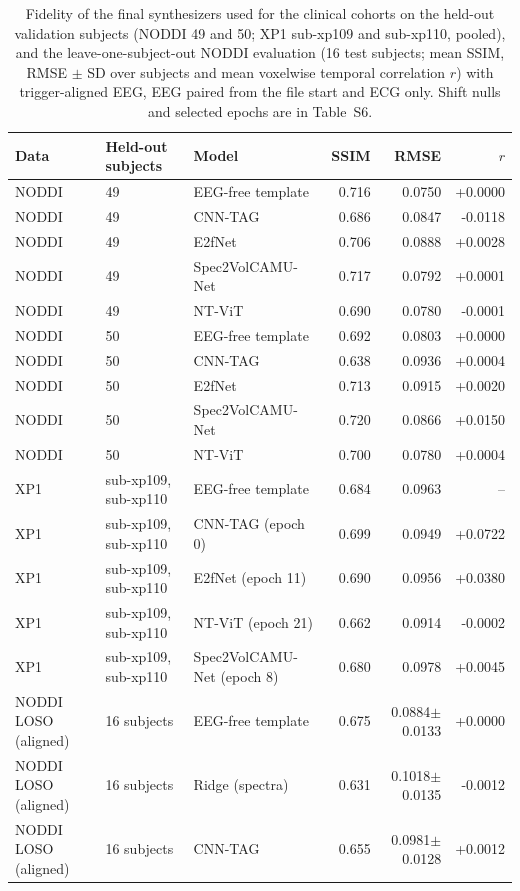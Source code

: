 \documentclass[10pt]{article}
\begin{document}
\begin{longtable}{l l l r r r}
\caption{Fidelity of the final synthesizers used for the clinical cohorts on the held-out validation subjects (NODDI 49 and 50; XP1 sub-xp109 and sub-xp110, pooled), and the leave-one-subject-out NODDI evaluation (16 test subjects; mean SSIM, RMSE $\pm$ SD over subjects and mean voxelwise temporal correlation $r$) with trigger-aligned EEG, EEG paired from the file start and ECG only. Shift nulls and selected epochs are in Table~S6.}\label{tab:s_fid}\\
\toprule
Data & Held-out subjects & Model & SSIM & RMSE & $r$ \\
\midrule
NODDI & 49 & EEG-free template & 0.716 & 0.0750 & +0.0000 \\
NODDI & 49 & CNN-TAG & 0.686 & 0.0847 & -0.0118 \\
NODDI & 49 & E2fNet & 0.706 & 0.0888 & +0.0028 \\
NODDI & 49 & Spec2VolCAMU-Net & 0.717 & 0.0792 & +0.0001 \\
NODDI & 49 & NT-ViT & 0.690 & 0.0780 & -0.0001 \\
NODDI & 50 & EEG-free template & 0.692 & 0.0803 & +0.0000 \\
NODDI & 50 & CNN-TAG & 0.638 & 0.0936 & +0.0004 \\
NODDI & 50 & E2fNet & 0.713 & 0.0915 & +0.0020 \\
NODDI & 50 & Spec2VolCAMU-Net & 0.720 & 0.0866 & +0.0150 \\
NODDI & 50 & NT-ViT & 0.700 & 0.0780 & +0.0004 \\
XP1 & sub-xp109, sub-xp110 & EEG-free template & 0.684 & 0.0963 & -- \\
XP1 & sub-xp109, sub-xp110 & CNN-TAG (epoch 0) & 0.699 & 0.0949 & +0.0722 \\
XP1 & sub-xp109, sub-xp110 & E2fNet (epoch 11) & 0.690 & 0.0956 & +0.0380 \\
XP1 & sub-xp109, sub-xp110 & NT-ViT (epoch 21) & 0.662 & 0.0914 & -0.0002 \\
XP1 & sub-xp109, sub-xp110 & Spec2VolCAMU-Net (epoch 8) & 0.680 & 0.0978 & +0.0045 \\
\midrule
NODDI LOSO (aligned) & 16 subjects & EEG-free template & 0.675 & 0.0884$\pm$0.0133 & +0.0000 \\
NODDI LOSO (aligned) & 16 subjects & Ridge (spectra) & 0.631 & 0.1018$\pm$0.0135 & -0.0012 \\
NODDI LOSO (aligned) & 16 subjects & CNN-TAG & 0.655 & 0.0981$\pm$0.0128 & +0.0012 \\

\end{longtable}
\end{document}
